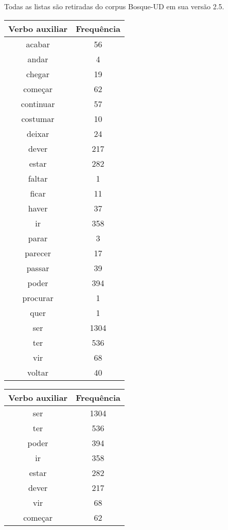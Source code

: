 \documentclass[output=paper,colorlinks,citecolor=brown]{langscibook}
\begin{document}
	Todas as listas são retiradas do corpus Bosque-UD em sua versão 2.5.

	\begin{table}[]
		\parbox{.45\linewidth}{
			\centering
			\begin{tabular}{|c|c|}
				\hline
				\textbf{Verbo auxiliar} & \textbf{Frequência} \\\hline
				acabar & 56\\\hline
				andar & 4\\\hline
				chegar & 19\\\hline
				começar & 62\\\hline
				continuar & 57\\\hline
				costumar & 10\\\hline
				deixar & 24\\\hline
				dever & 217\\\hline
				estar & 282\\\hline
				faltar & 1\\\hline
				ficar & 11\\\hline
				haver & 37\\\hline
				ir & 358\\\hline
				parar & 3\\\hline
				parecer & 17\\\hline
				passar & 39\\\hline
				poder & 394\\\hline
				procurar & 1\\\hline
				quer & 1\\\hline
				ser & 1304\\\hline
				ter & 536\\\hline
				vir & 68\\\hline
				voltar & 40\\\hline
			\end{tabular}
		}
		\hfill
		\parbox{.45\linewidth}{
			\centering
			\begin{tabular}{|c|c|}
				\hline
				\textbf{Verbo auxiliar} & \textbf{Frequência} \\\hline
				ser & 1304\\\hline
				ter & 536\\\hline
				poder & 394\\\hline
				ir & 358\\\hline
				estar & 282\\\hline
				dever & 217\\\hline
				vir & 68\\\hline
				começar & 62\\\hline

\end{tabular}}
\end{table}
\end{document}
